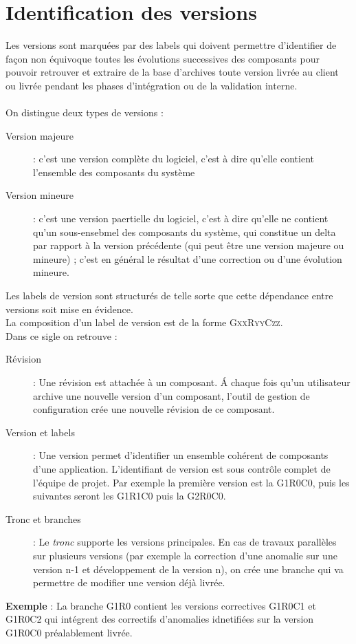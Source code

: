 \section{Identification des versions}
\label{versionning}
Les versions sont marquées par des labels qui doivent permettre d'identifier de façon non équivoque toutes les évolutions successives des composants pour pouvoir retrouver et extraire de la base d'archives toute version livrée au client ou livrée pendant les phases d'intégration ou de la validation interne.
\\\\
On distingue deux types de versions :
\begin{description}
	\item[Version majeure] : c'est une version complète du logiciel, c'est à dire qu'elle contient l'ensemble des composants du système
	\item[Version mineure] : c'est une version paertielle du logiciel, c'est à dire qu'elle ne contient qu'un sous-ensebmel des composants du système, qui constitue un delta par rapport à la version précédente
	(qui peut être une version majeure ou mineure) ; c'est en général le résultat d'une correction ou d'une évolution mineure.
\end{description}
Les labels de version sont structurés de telle sorte que cette dépendance entre versions soit mise en évidence.
\\La composition d'un label de version est de la forme \textsc{GxxRyyCzz}.
\\Dans ce sigle on retrouve :
\begin{description}
	\item[Révision] : Une révision est attachée à un composant. \'A chaque fois qu'un utilisateur archive une nouvelle version d'un composant, l'outil de gestion de configuration crée une nouvelle révision de ce composant.
	\item[Version et labels] : Une version permet d'identifier un ensemble cohérent de composants d'une application. L'identifiant de version est sous contrôle complet de l'équipe de projet. Par exemple la première version est la G1R0C0, puis les suivantes seront les
	G1R1C0 puis la G2R0C0.
	\item[Tronc et branches] : Le \textit{tronc} supporte les versions principales. En cas de travaux parallèles sur plusieurs versions (par exemple la correction d'une anomalie sur une version n-1 et développement de la version n), on crée une branche qui va permettre de modifier une version déjà livrée.
	\\
\end{description}
\textbf{Exemple} : La branche G1R0 contient les versions correctives G1R0C1 et G1R0C2 qui intégrent des correctifs d'anomalies idnetifiées sur la version G1R0C0 préalablement livrée.
\setlength{\unitlength}{1.3cm}


